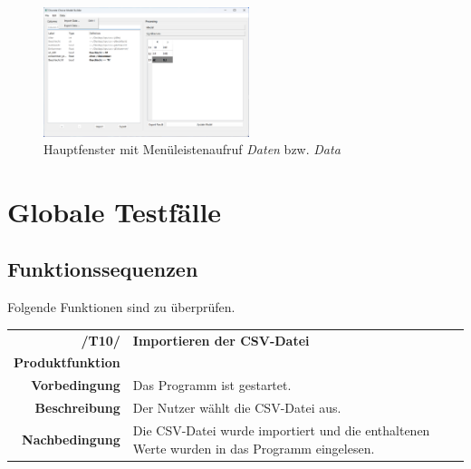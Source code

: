 \documentclass{article}
\begin{document}
\begin{figure}[H]%
  \centering
  \includegraphics[width=6cm,trim={0 13cm 18cm 0},clip]{specifications/img/gui-screenshots/menubar3-data.png}
  \caption{Hauptfenster mit Menüleistenaufruf \emph{Daten} bzw. \emph{Data}}
  \label{gui:fig_menubar3-data}
\end{figure}

\clearpage
\section{Globale Testfälle}

\subsection{Funktionssequenzen}
Folgende Funktionen sind zu überprüfen.

\begin{table}[H]
\begin{tabularx}{\textwidth}{rX}
\vspace{1mm}
\textbf{/T10/}         & \textbf{Importieren der CSV-Datei} \\ \vspace{1mm}
\textbf{Produktfunktion} & \nameref{sec:f:Projekt laden}\\ \vspace{1mm}
\textbf{Vorbedingung}  & Das Programm ist gestartet. \\ \vspace{1mm}
\textbf{Beschreibung}  & Der Nutzer wählt die CSV-Datei aus. \\
\textbf{Nachbedingung} & Die CSV-Datei wurde importiert und die enthaltenen Werte wurden in das Programm eingelesen.
\end{tabularx}
\end{table}
\end{document}
